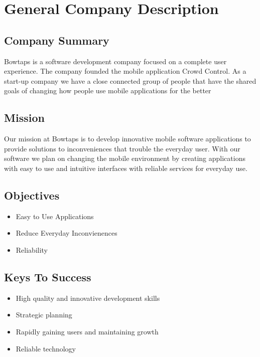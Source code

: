 

\chapter{General Company Description}


\section{Company Summary}

Bowtaps is a software development company focused on a complete user experience. The company founded the mobile application Crowd Control. As a start-up company we have a close connected group of people that have the shared goals of changing how people use mobile applications for the better

\section{Mission}

Our mission at Bowtaps is to develop innovative mobile software applications to provide solutions to inconveniences that trouble the everyday user. With our software we plan on changing the mobile environment by creating applications with easy to use and intuitive interfaces with reliable services for everyday use.

\section{Objectives}

	\begin{itemize}
	\item Easy to Use Applications
	\item Reduce Everyday Inconvienences
	\item Reliability
	\end{itemize}


\section{Keys To Success}

	\begin{itemize}
	\item High quality and innovative development skills
	\item Strategic planning 
	\item Rapidly gaining users and maintaining growth 
	\item Reliable technology
	\end{itemize}

